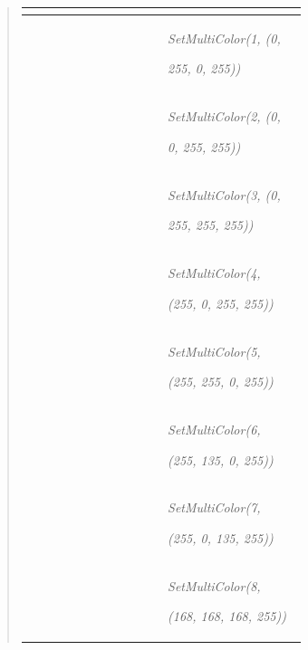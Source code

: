 \documentclass[letterpaper,10pt,english]{sphinxmanual}
\begin{document}
\begin{quote}
\begin{longtable}{|p{0.475\linewidth}|p{0.475\linewidth}|}
\begin{DUlineblock}{0em}
\end{DUlineblock}
\\
\hline & 
\begin{DUlineblock}{0em}
\item[] \emph{SetMultiColor(1, (0,}
\item[] \emph{255, 0, 255))}
\end{DUlineblock}
\\
\hline & 
\begin{DUlineblock}{0em}
\item[] \emph{SetMultiColor(2, (0,}
\item[] \emph{0, 255, 255))}
\end{DUlineblock}
\\
\hline & 
\begin{DUlineblock}{0em}
\item[] \emph{SetMultiColor(3, (0,}
\item[] \emph{255, 255, 255))}
\end{DUlineblock}
\\
\hline & 
\begin{DUlineblock}{0em}
\item[] \emph{SetMultiColor(4,}
\item[] \emph{(255, 0, 255, 255))}
\end{DUlineblock}
\\
\hline & 
\begin{DUlineblock}{0em}
\item[] \emph{SetMultiColor(5,}
\item[] \emph{(255, 255, 0, 255))}
\end{DUlineblock}
\\
\hline & 
\begin{DUlineblock}{0em}
\item[] \emph{SetMultiColor(6,}
\item[] \emph{(255, 135, 0, 255))}
\end{DUlineblock}
\\
\hline & 
\begin{DUlineblock}{0em}
\item[] \emph{SetMultiColor(7,}
\item[] \emph{(255, 0, 135, 255))}
\end{DUlineblock}
\\
\hline & 
\begin{DUlineblock}{0em}
\item[] \emph{SetMultiColor(8,}
\item[] \emph{(168, 168, 168, 255))}
\end{DUlineblock}

\end{longtable}
\end{quote}
\end{document}
